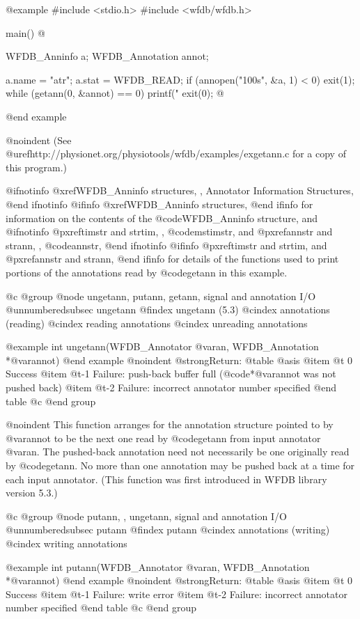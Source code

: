 {{{{{{{{@example
#include <stdio.h>
#include <wfdb/wfdb.h>

main()
@{
    WFDB_Anninfo a;
    WFDB_Annotation annot;

    a.name = "atr"; a.stat = WFDB_READ;
    if (annopen("100s", &a, 1) < 0)
        exit(1);
    while (getann(0, &annot) == 0)
        printf("%
    exit(0);
@}
@end example

@noindent
(See @uref{http://physionet.org/physiotools/wfdb/examples/exgetann.c}
for a copy of this program.)

@ifnotinfo
@xref{WFDB_Anninfo structures, , Annotator Information Structures},
@end ifnotinfo
@ifinfo
@xref{WFDB_Anninfo structures},
@end ifinfo
for information on the contents of the @code{WFDB_Anninfo} structure,
and
@ifnotinfo
@pxref{timstr and strtim, , @code{mstimstr}}, and
@pxref{annstr and strann, , @code{annstr}},
@end ifnotinfo
@ifinfo
@pxref{timstr and strtim}, and @pxref{annstr and strann},
@end ifinfo
for details of the functions used to print portions of the annotations
read by @code{getann} in this example.

@c @group
@node     ungetann, putann, getann, signal and annotation I/O
@unnumberedsubsec ungetann
@findex ungetann (5.3)
@cindex annotations (reading)
@cindex reading annotations
@cindex unreading annotations

@example
int ungetann(WFDB_Annotator @var{an}, WFDB_Annotation *@var{annot})
@end example
@noindent
@strong{Return:}
@table @asis
@item @t{ 0}
Success
@item @t{-1}
Failure: push-back buffer full (@code{*@var{annot}} was not pushed back)
@item @t{-2}
Failure: incorrect annotator number specified
@end table
@c @end group

@noindent
This function arranges for the annotation structure pointed to by
@var{annot} to be the next one read by @code{getann} from input
annotator @var{an}.  The pushed-back annotation need not necessarily be
one originally read by @code{getann}.  No more than one annotation may
be pushed back at a time for each input annotator.  (This function was
first introduced in WFDB library version 5.3.)

@c @group
@node     putann, , ungetann, signal and annotation I/O
@unnumberedsubsec putann
@findex putann
@cindex annotations (writing)
@cindex writing annotations

@example
int putann(WFDB_Annotator @var{an}, WFDB_Annotation *@var{annot})
@end example
@noindent
@strong{Return:}
@table @asis
@item @t{ 0}
Success
@item @t{-1}
Failure: write error
@item @t{-2}
Failure: incorrect annotator number specified
@end table
@c @end group

}}}}}}}}
